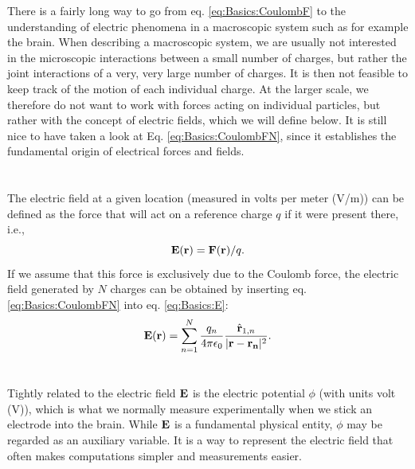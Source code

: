 There is a fairly long way to go from eq. \ref{eq:Basics:CoulombF} to the understanding of electric phenomena in a macroscopic system such as for example the brain. When describing a macroscopic system, we are usually not interested in the microscopic interactions between a small number of charges, but rather the joint interactions of a very, very large number of charges. It is then not feasible to keep track of the motion of each individual charge. At the larger scale, we therefore do not want to work with forces acting on individual particles, but rather with the concept of electric fields, which we will define below. It is still nice to have taken a look at  Eq. \ref{eq:Basics:CoulombFN}, since it establishes the fundamental origin of electrical forces and fields. 


\section{}
\label{sec:Basics:Fields} 
The electric field at a given location (measured in volts per meter (V/m)) can be defined as the force that will act on a reference charge $q$ if it were present there, i.e., 
\begin{equation}
{\bf E}({\bf r}) = {\bf F}({\bf r})/q.
\label{eq:Basics:E}
\end{equation}
If we assume that this force is exclusively due to the Coulomb force, the electric field generated by $N$ charges can be obtained by inserting eq. \ref{eq:Basics:CoulombFN} into eq. \ref{eq:Basics:E}:
\begin{equation}
{\bf E}({\bf r}) = \sum_{n=1}^{N}  \frac{q_n}{4\pi \epsilon_0} \frac{\hat{{\bf r}}_{1,n}}{|{\bf r}-{\bf r_n}|^2}.
\label{eq:Basics:CoulombEN}
\end{equation}


\section{}
\label{sec:Basics:Potential} 
Tightly related to the electric field ${\bf E}$ is the electric potential $\phi$ (with units volt (V)), which is what we normally measure experimentally when we stick an electrode into the brain. While ${\bf E}$ is a fundamental physical entity, $\phi$ may be regarded as an auxiliary variable. It is a way to represent the electric field that often makes computations simpler and measurements easier. 

